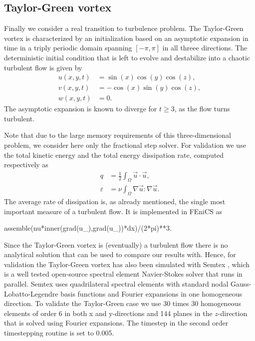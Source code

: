 \subsection{Taylor-Green vortex}
Finally we consider a real transition to turbulence problem. The Taylor-Green vortex is characterized by an initialization based on an asymptotic expansion in time in a triply periodic domain spanning $[-\pi,\pi]$ in all threee directions. The deterministic initial condition that is left to evolve and destabilize into a chaotic turbulent flow is given by
\begin{align}
 u(x,y,t)&=\sin(x)\cos(y)\cos(z),\\
 v(x,y,t)&=-\cos(x)\sin(y)\cos(z),\\
 w(x,y,t)&=0.
\end{align}
The asymptotic expansion is known to diverge for $t \ge 3$, as the flow turns turbulent.

Note that due to the large memory requirements of this three-dimensional problem, we consider here only the fractional step solver. For validation we use the total kinetic energy and the total energy dissipation rate, computed respectively as
\begin{align}
 q &= \frac{1}{2} \int_{\Omega} \vec{u} \cdot \vec{u}, \label{eq:q} \\
 \varepsilon &= \nu \int_{\Omega} \nabla \vec{u}: \nabla \vec{u}. \label{eq:diss}
\end{align}
The average rate of dissipation is, as already mentioned, the single most important measure of a turbulent flow. It is implemented in FEniCS as
\begin{python}
   assemble(nu*inner(grad(u_),grad(u_))*dx)/(2*pi)**3.
\end{python}

Since the Taylor-Green vortex is (eventually) a turbulent flow there is no analytical solution that can be used to compare our results with. Hence, for validation the Taylor-Green vortex has also been simulated with Semtex \cite{Blackburn2009}, which is a well tested open-source spectral element Navier-Stokes solver that runs in parallel. Semtex uses quadrilateral spectral elements with standard nodal Gauss-Lobatto-Legendre basis functions and Fourier expansions in one homogeneous direction. To validate the Taylor-Green case we use 30 times 30 homogeneous elements of order 6 in both x and y-directions and 144 planes in the $z$-direction that is solved using Fourier expansions. The timestep in the second order timestepping routine is set to 0.005.

